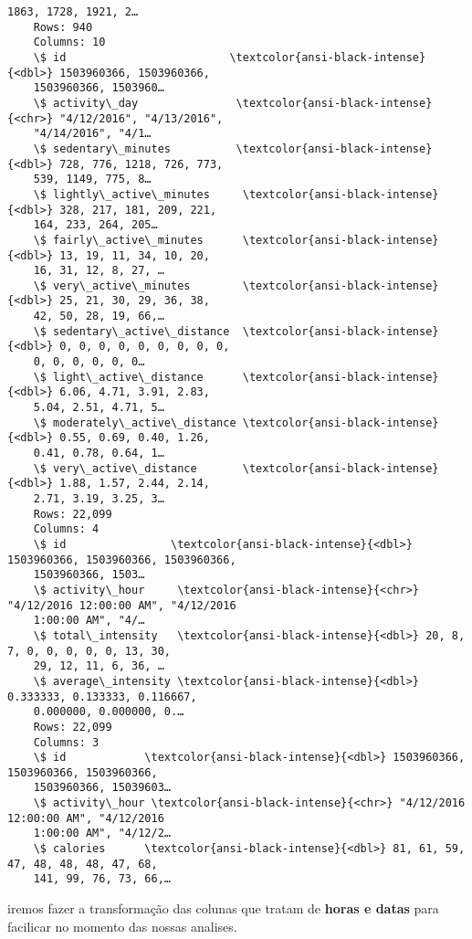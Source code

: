 \documentclass[11pt]{article}
\begin{document}
\begin{Verbatim}[commandchars=\\\{\}]
    1863, 1728, 1921, 2…
    Rows: 940
    Columns: 10
    \$ id                         \textcolor{ansi-black-intense}{<dbl>} 1503960366, 1503960366,
    1503960366, 1503960…
    \$ activity\_day               \textcolor{ansi-black-intense}{<chr>} "4/12/2016", "4/13/2016",
    "4/14/2016", "4/1…
    \$ sedentary\_minutes          \textcolor{ansi-black-intense}{<dbl>} 728, 776, 1218, 726, 773,
    539, 1149, 775, 8…
    \$ lightly\_active\_minutes     \textcolor{ansi-black-intense}{<dbl>} 328, 217, 181, 209, 221,
    164, 233, 264, 205…
    \$ fairly\_active\_minutes      \textcolor{ansi-black-intense}{<dbl>} 13, 19, 11, 34, 10, 20,
    16, 31, 12, 8, 27, …
    \$ very\_active\_minutes        \textcolor{ansi-black-intense}{<dbl>} 25, 21, 30, 29, 36, 38,
    42, 50, 28, 19, 66,…
    \$ sedentary\_active\_distance  \textcolor{ansi-black-intense}{<dbl>} 0, 0, 0, 0, 0, 0, 0, 0, 0,
    0, 0, 0, 0, 0, 0…
    \$ light\_active\_distance      \textcolor{ansi-black-intense}{<dbl>} 6.06, 4.71, 3.91, 2.83,
    5.04, 2.51, 4.71, 5…
    \$ moderately\_active\_distance \textcolor{ansi-black-intense}{<dbl>} 0.55, 0.69, 0.40, 1.26,
    0.41, 0.78, 0.64, 1…
    \$ very\_active\_distance       \textcolor{ansi-black-intense}{<dbl>} 1.88, 1.57, 2.44, 2.14,
    2.71, 3.19, 3.25, 3…
    Rows: 22,099
    Columns: 4
    \$ id                \textcolor{ansi-black-intense}{<dbl>} 1503960366, 1503960366, 1503960366,
    1503960366, 1503…
    \$ activity\_hour     \textcolor{ansi-black-intense}{<chr>} "4/12/2016 12:00:00 AM", "4/12/2016
    1:00:00 AM", "4/…
    \$ total\_intensity   \textcolor{ansi-black-intense}{<dbl>} 20, 8, 7, 0, 0, 0, 0, 0, 13, 30,
    29, 12, 11, 6, 36, …
    \$ average\_intensity \textcolor{ansi-black-intense}{<dbl>} 0.333333, 0.133333, 0.116667,
    0.000000, 0.000000, 0.…
    Rows: 22,099
    Columns: 3
    \$ id            \textcolor{ansi-black-intense}{<dbl>} 1503960366, 1503960366, 1503960366,
    1503960366, 15039603…
    \$ activity\_hour \textcolor{ansi-black-intense}{<chr>} "4/12/2016 12:00:00 AM", "4/12/2016
    1:00:00 AM", "4/12/2…
    \$ calories      \textcolor{ansi-black-intense}{<dbl>} 81, 61, 59, 47, 48, 48, 48, 47, 68,
    141, 99, 76, 73, 66,…
\end{Verbatim}

iremos fazer a transformação das colunas que tratam de \textbf{horas e
    datas} para facilicar no momento das nossas analises.
\end{document}
